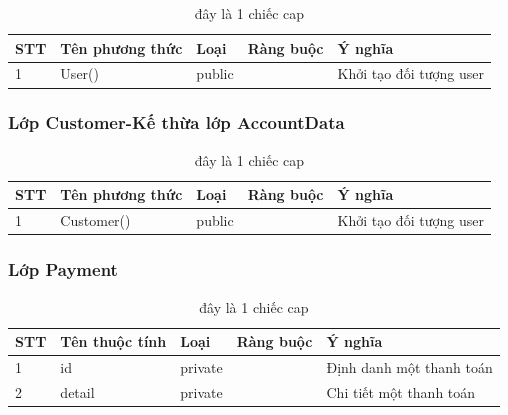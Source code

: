 \documentclass[a4paper, 12pt]{article}
\begin{document}
\begin{table}[H]
	\begin{center}
		\begin{tabular}{|l|l|l|l|l|}
		\hline
		STT & Tên phương thức          & Loại   & Ràng buộc & Ý nghĩa                                                                           \\ \hline
		1   & User() 				   & public &           & Khởi tạo đối tượng user \\ \hline
		\end{tabular}
		\caption{đây là 1 chiếc cap}
	\end{center}
\end{table}

\subsubsection{Lớp Customer-Kế thừa lớp AccountData}

\begin{table}[H]
	\begin{center}
		\begin{tabular}{|l|l|l|l|l|}
			\hline
			STT & Tên phương thức          & Loại   & Ràng buộc & Ý nghĩa                                                                           \\ \hline
			1   & Customer() 				   & public &           & Khởi tạo đối tượng user \\ \hline
		\end{tabular}
		\caption{đây là 1 chiếc cap}
	\end{center}
\end{table}

\subsubsection{Lớp Payment}

\begin{table}[H]
	\begin{center}
		\begin{tabular}{|l|l|l|l|l|}
		\hline
		STT & Tên thuộc tính & Loại    & Ràng buộc & Ý nghĩa                  \\ \hline
		1   & id             & private &           & Định danh một thanh toán \\ \hline
		2   & detail         & private &           & Chi tiết một thanh toán  \\ \hline
		\end{tabular}
		\caption{đây là 1 chiếc cap}
	\end{center}
\end{table}
\end{document}
